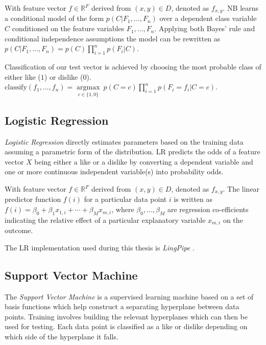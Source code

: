With feature vector $f \in \mathbb{R}^F$ derived from $(x,y) \in D$, denoted as $f_{x,y}$. NB learns a conditional model of the form 
$p(C|F_1, \dots, F_n)$ over a dependent class variable $C$ conditioned on the feature variables $F_1, \dots, F_n$. Applying both Bayes' rule 
and conditional independence assumptions the model can be rewritten as $p(C|F_1, \dots, F_n) = p(C) \displaystyle\prod_{i=1}^n p(F_i|C)$.

Classification of our test vector is achieved by choosing the most probable class of either like ($1$) or dislike ($0$).
\\
$\mathrm{classify}(f_1,\dots,f_n) = \underset{c \in \{1,0\}}{\operatorname{argmax}} \ p(C=c) \displaystyle\prod_{i=1}^n p(F_i=f_i\vert C=c)$.

\subsection{Logistic Regression}
\label{sec:lr}

\emph{Logistic Regression} directly estimates parameters based on the training data assuming a parametric form of the distribution.
LR predicts the odds of a feature vector $X$ being either a like or a dislike by converting a dependent variable and 
one or more continuous independent variable(s) into probability odds.

With feature vector $f \in \mathbb{R}^F$ derived from $(x,y) \in D$, denoted as $f_{x,y}$. The linear predictor function $f(i)$ for a particular 
data point $i$ is written as $f(i) = \beta_0 + \beta_1 x_{1,i} + \cdots + \beta_M x_{m,i}$, where $\beta_0, \ldots, \beta_M$ are 
regression co-efficients indicating the relative effect of a particular explanatory variable $x_{m,i}$ on the outcome.

The LR implementation used during this thesis is \emph{LingPipe} \cite{lin}.

\subsection{Support Vector Machine}
\label{sec:svm}

The \emph{Support Vector Machine} is a supervised learning machine based on a set of basis functions which help construct 
a separating hyperplane between data points. Training involves building the relevant hyperplanes which can then be used for testing. 
Each data point is classified as a like or dislike depending on which side of the hyperplane it falls.

